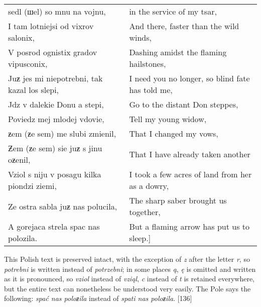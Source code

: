 \begin{footnotesize}
\begin{longtable}{ l l }
    \hspace*{0.5cm}sedl (шel) so mnu na vojnu, & \hspace*{0.5cm}in the service of my tsar, \\
    I tam lotniejsi od vixrov salonix, & And there, faster than the wild winds, \\
    V posrod ognistix gradov vipusconix, & Dashing amidst the flaming hailstones, \\
    Juƶ jes mi niepotrebni, tak kazal los slepi, & I need you no longer, so blind fate has told me, \\
    Jdz v dalekie Donu a stepi, & Go to the distant Don steppes, \\
    Poviedz mej mlodej vdovie, & Tell my young widow, \\
    \hspace*{0.5cm} ƶem (ƶe sem) me slubi zmienil, & \hspace*{0.5cm} That I changed my vows, \\
    Ƶem (ƶe sem) sie juƶ s jinu oƶenil, & That I have already taken another \\
    Vziol s niju v posagu kilka piondzi ziemi, & I took a few acres of land from her as a dowry, \\
    Ze ostra sabla juƶ nas polucila, & The sharp saber brought us together, \\
    A gorejaca strela spac nas polozila. & But a flaming arrow has put us to sleep.] \\
\end{longtable}
\end{footnotesize}

This Polish text is preserved intact, with the exception of \textit{z} after the letter \textit{r}, so \textit{potrebni} is written instead of \textit{potrzebni}; in some places \textit{ą}, \textit{ę} is omitted and written as it is pronounced, so \textit{vziol} instead of \textit{vziąl}, \textit{c} instead of \textit{t} is retained everywhere, but the entire text can nonetheless be understood very easily. The Pole says the following: \textit{spać nas poloƶila} instead of \textit{spati nas poloƶila}. [136]

